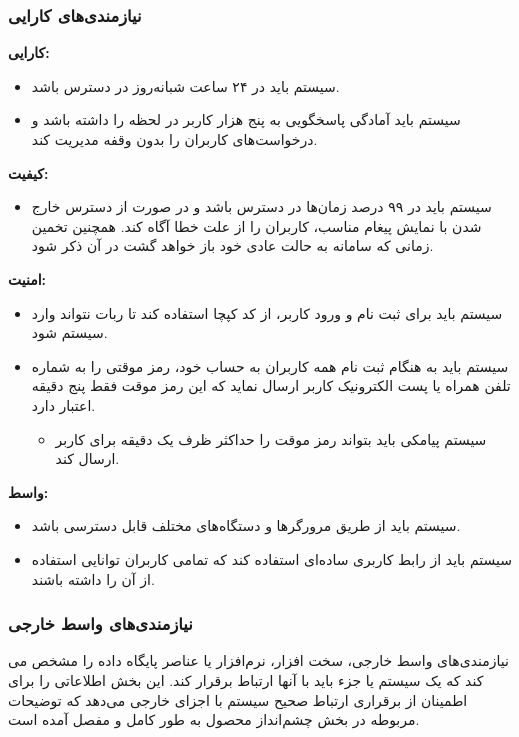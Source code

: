 \documentclass[12pt]{article}
\begin{document}
	\subsubsection{نیازمندی‌های کارایی}

	\textbf{کارایی:}
	\begin{itemize}
		\item
			سیستم باید در ۲۴ ساعت شبانه‌روز در دسترس باشد.
		\item
		سیستم باید آمادگی پاسخگویی به پنج هزار کاربر در لحظه را داشته باشد و درخواست‌های کاربران را بدون وقفه مدیریت کند.
	\end{itemize}

	\textbf{کیفیت:}
	\begin{itemize}
		\item
		 سیستم باید در ۹۹ درصد زمان‌ها در دسترس باشد و در صورت از دسترس خارج شدن با نمایش پیغام مناسب، کاربران را از علت خطا آگاه کند. همچنین تخمین زمانی که سامانه به حالت عادی خود باز خواهد گشت در آن ذکر شود.
	\end{itemize}

	\textbf{امنیت:}
	\begin{itemize}
		\item
		سیستم باید برای ثبت نام و ورود کاربر، از کد کپچا استفاده کند تا ربات نتواند وارد سیستم شود.
		\item
		سیستم باید به هنگام ثبت نام همه کاربران به حساب خود، رمز موقتی را به شماره تلفن همراه یا پست الکترونیک کاربر ارسال نماید که این رمز موقت فقط پنج دقیقه اعتبار دارد.
		\begin{itemize}
			\item
			سیستم پیامکی باید بتواند رمز موقت را حداکثر ظرف یک دقیقه برای کاربر ارسال کند.
		\end{itemize}
	\end{itemize}

	\textbf{واسط:}
	\begin{itemize}
		\item
		سیستم باید از طریق مرورگرها و دستگاه‌های مختلف قابل دسترسی باشد.
		\item
		سیستم باید از رابط کاربری ساده‌ای استفاده کند که تمامی کاربران توانایی استفاده از آن را داشته باشند.
	\end{itemize}

	\subsubsection{نیازمندی‌های واسط خارجی}
	نیازمندی‌های واسط خارجی، سخت افزار، نرم‌افزار یا عناصر پایگاه داده را مشخص می کند که یک سیستم یا جزء باید با آنها ارتباط برقرار کند. این بخش اطلاعاتی را برای اطمینان از برقراری ارتباط صحیح سیستم با اجزای خارجی می‌دهد که توضیحات مربوطه در بخش چشم‌انداز محصول به طور کامل و مفصل آمده است.
\end{document}
